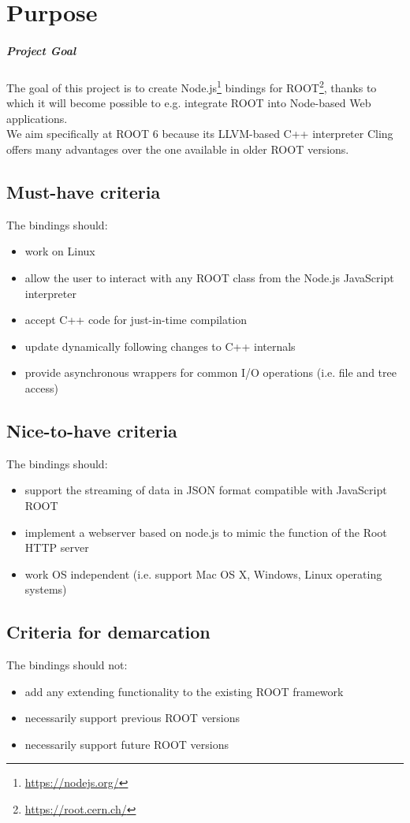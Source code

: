 \chapter{Purpose}
\paragraph{Project Goal}
The goal of this project is to create Node.js\textsuperscript{\textregistered}\footnote{\url{https://nodejs.org/}} bindings for
ROOT\footnote{\url{https://root.cern.ch/}}, thanks to which it will become possible to e.g. integrate ROOT into Node-based Web applications.\\
We aim specifically at ROOT 6 because its LLVM-based C++ interpreter Cling offers many advantages over the one available in older ROOT versions.
\section{Must-have criteria}
The bindings should:
\begin{itemize}
	\item work on Linux
	\item allow the user to interact with any ROOT class from the Node.js JavaScript interpreter
	\item accept C++ code for just-in-time compilation
	\item update dynamically following changes to C++ internals
	\item provide asynchronous wrappers for common I/O operations (i.e. file and tree access)
\end{itemize}
\pagebreak[3]

\section{Nice-to-have criteria}
The bindings should:
\begin{itemize}
	\item support the streaming of data in JSON format compatible with JavaScript ROOT
	\item implement a webserver based on node.js to mimic the function of the Root HTTP server
	\item work OS independent (i.e. support Mac OS X, Windows, Linux operating systems)
\end{itemize}

\section{Criteria for demarcation}
The bindings should not:
\begin{itemize}
	\item add any extending functionality to the existing ROOT framework
	\item necessarily support previous ROOT versions
	\item necessarily support future ROOT versions
\end{itemize}
